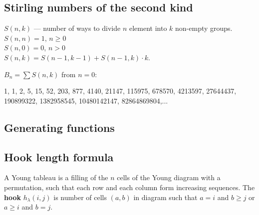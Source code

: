 \subsection{Stirling numbers of the second kind}

$S(n, k)$ --- number of ways to divide $n$ element into $k$ non-empty groups.\\

$S(n, n) = 1$, $n \ge 0$\\
$S(n, 0) = 0$, $n > 0$\\

$S(n, k) = S(n - 1, k - 1) + S(n - 1, k) \cdot k$.


$B_n = \sum S(n, k)$ from $n = 0$:

1, 1, 2, 5, 15, 52, 203, 877, 4140, 21147, 115975, 678570, 4213597, 27644437, 190899322, 1382958545, 10480142147, 82864869804,...

\vspace{7pt}

\subsection{Generating functions}

\vspace{7pt}

\subsection{Hook length formula}
A Young tableau is a filling of the $n$ cells of the Young diagram with a permutation, 
such that each row and each column form increasing sequences. 
The \textbf{hook} $h_{\lambda}(i, j)$ is number of cells $(a, b)$ in diagram such that
$a = i$ and $b \ge j$ or $a \ge i$ and $b = j$.

